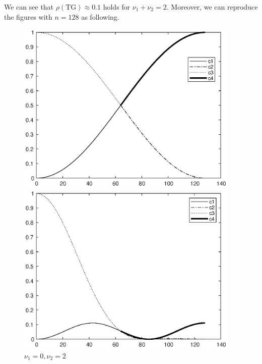 \documentclass[twoside,a4paper]{article}
\begin{document}
We can see that $\rho(\text{TG})\approx 0.1$ holds for $\nu_1+\nu_2=2$. Moreover, we can reproduce the figures with $n=128$ as following.

\begin{figure}[H]
    \centering
    \begin{minipage}[t]{0.32\textwidth}
        \centering
        \includegraphics[width=0.95\textwidth]{figure/ex9_41_00_128.eps}
        \caption*{$\nu_1=0,\nu_2=0$}
    \end{minipage}
    \begin{minipage}[t]{0.32\textwidth}
        \centering
        \includegraphics[width=0.95\textwidth]{figure/ex9_41_02_128.eps}
        \caption*{$\nu_1=0,\nu_2=2$}
    \end{minipage}

\end{figure}
\end{document}
